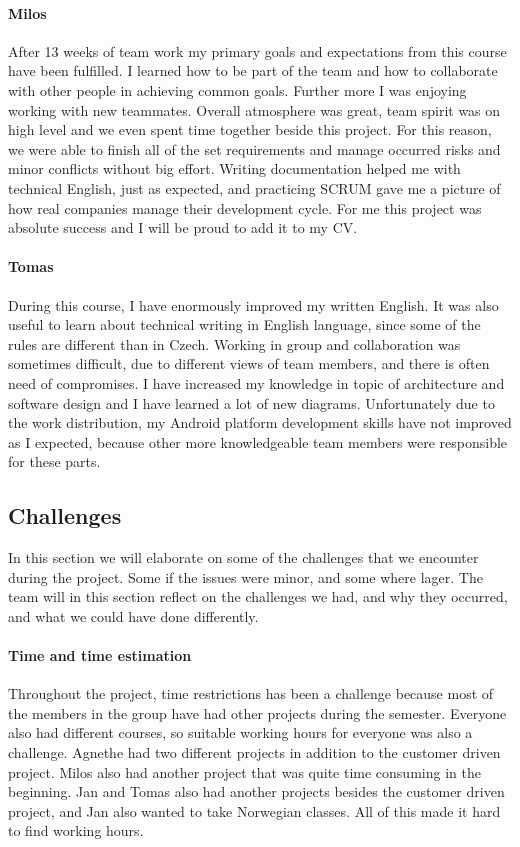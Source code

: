\paragraph{Milos}
After 13 weeks of team work my primary goals and expectations from this course have been fulfilled. I learned how to be part of the team and how to collaborate with other people in achieving common goals. Further more I was enjoying working with new teammates. Overall atmosphere was great, team spirit was on high level and we even spent time together beside this project. For this reason, we were able to finish all of the set requirements and manage occurred risks and minor conflicts without big effort. Writing documentation helped me with technical English, just as expected, and practicing SCRUM gave me a picture of how real companies manage their development cycle. For me this project was absolute success and I will be proud to add it to my CV.

\paragraph{Tomas}
During this course, I have enormously improved my written English. 
It was also useful to learn about technical writing in English language, since some of the rules are different than in Czech.
Working in group and collaboration was sometimes difficult, due to different views of team members, and there is often need of compromises.
I have increased my knowledge in topic of architecture and software design and I have learned a lot of new diagrams.
Unfortunately due to the work distribution, my Android platform development skills have not improved as I expected, because other more knowledgeable team members were responsible for these parts.

\subsection{Challenges}
In this section we will elaborate on some of the challenges that we encounter during the project. Some if the issues were minor, and some where lager. The team will in this section reflect on the challenges we had, and why they occurred, and what we could have done differently.

\paragraph{Time and time estimation}

Throughout the project, time restrictions has been a challenge because most of the members in the group have had other projects during the semester. Everyone also had different courses, so suitable working hours for everyone was also a challenge. Agnethe had two different projects in addition to the customer driven project. Milos also had another project that was quite time consuming in the beginning. Jan and Tomas also had another projects besides the customer driven project, and Jan also wanted to take Norwegian classes. All of this made it hard to find working hours. 

